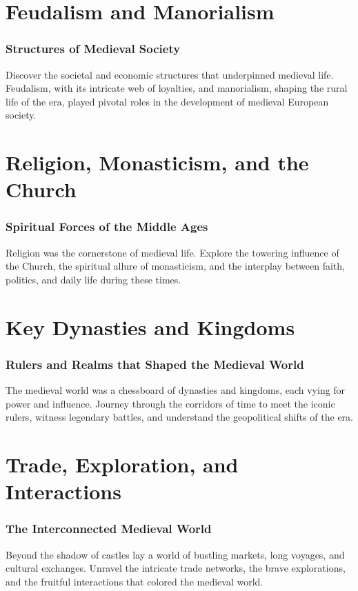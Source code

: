 \documentclass[a4paper,12pt]{book}
\begin{document}
\chapter{Feudalism and Manorialism}
\subsection*{Structures of Medieval Society}
Discover the societal and economic structures that underpinned medieval life. Feudalism, with its intricate web of loyalties, and manorialism, shaping the rural life of the era, played pivotal roles in the development of medieval European society.

\chapter{Religion, Monasticism, and the Church}
\subsection*{Spiritual Forces of the Middle Ages}
Religion was the cornerstone of medieval life. Explore the towering influence of the Church, the spiritual allure of monasticism, and the interplay between faith, politics, and daily life during these times.

\chapter{Key Dynasties and Kingdoms}
\subsection*{Rulers and Realms that Shaped the Medieval World}
The medieval world was a chessboard of dynasties and kingdoms, each vying for power and influence. Journey through the corridors of time to meet the iconic rulers, witness legendary battles, and understand the geopolitical shifts of the era.

\chapter{Trade, Exploration, and Interactions}
\subsection*{The Interconnected Medieval World}
Beyond the shadow of castles lay a world of bustling markets, long voyages, and cultural exchanges. Unravel the intricate trade networks, the brave explorations, and the fruitful interactions that colored the medieval world.
\end{document}
